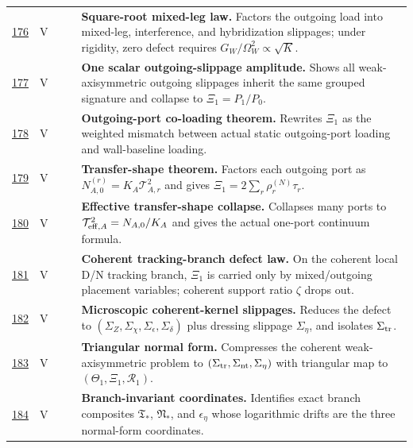 {\begin{longtable}{@{}L{0.055\textwidth}L{0.075\textwidth}L{0.145\textwidth}L{0.235\textwidth}L{0.43\textwidth}@{}}
\addlinespace
\hyperref[stage:176]{176} & V &  & \StatusExactClosure{} & \textbf{Square-root mixed-leg law.} Factors the outgoing load into mixed-leg, interference, and hybridization slippages; under rigidity, zero defect requires \(G_W/\Omega_W^2\propto\sqrt K\). \\
\addlinespace
\hyperref[stage:177]{177} & V &  & \StatusExactClosure{} & \textbf{One scalar outgoing-slippage amplitude.} Shows all weak-axisymmetric outgoing slippages inherit the same grouped signature and collapse to \(\Xi_1=P_1/P_0\). \\
\addlinespace
\hyperref[stage:178]{178} & V &  & \StatusExactClosure{} & \textbf{Outgoing-port co-loading theorem.} Rewrites \(\Xi_1\) as the weighted mismatch between actual static outgoing-port loading and wall-baseline loading. \\
\addlinespace
\hyperref[stage:179]{179} & V &  & \StatusExactClosure{} & \textbf{Transfer-shape theorem.} Factors each outgoing port as \(N_{A,0}^{(r)}=K_A\mathcal T_{A,r}^2\) and gives \(\Xi_1=2\sum_r\rho_r^{(N)}\tau_r\). \\
\addlinespace
\hyperref[stage:180]{180} & V &  & \StatusExactClosure{} & \textbf{Effective transfer-shape collapse.} Collapses many ports to \(\mathcal T_{{\rm eff},A}^2=N_{A,0}/K_A\) and gives the actual one-port continuum formula. \\
\addlinespace
\hyperref[stage:181]{181} & V &  & \StatusExactClosure{} & \textbf{Coherent tracking-branch defect law.} On the coherent local D/N tracking branch, \(\Xi_1\) is carried only by mixed/outgoing placement variables; coherent support ratio \(\zeta\) drops out. \\
\addlinespace
\hyperref[stage:182]{182} & V &  & \StatusExactClosure{} & \textbf{Microscopic coherent-kernel slippages.} Reduces the defect to \((\Sigma_Z,\Sigma_\chi,\Sigma_\epsilon,\Sigma_\delta)\) plus dressing slippage \(\Sigma_\eta\), and isolates \(\Sigma_{\rm tr}\). \\
\addlinespace
\hyperref[stage:183]{183} & V &  & \StatusExactClosure{} & \textbf{Triangular normal form.} Compresses the coherent weak-axisymmetric problem to \((\Sigma_{\rm tr},\Sigma_{\rm nt},\Sigma_\eta)\) with triangular map to \((\Theta_1,\Xi_1,\mathcal R_1)\). \\
\addlinespace
\hyperref[stage:184]{184} & V &  & \StatusExactClosure{} & \textbf{Branch-invariant coordinates.} Identifies exact branch composites \(\mathfrak T_*\), \(\mathfrak N_*\), and \(\epsilon_\eta\) whose logarithmic drifts are the three normal-form coordinates. \\

\end{longtable}}
